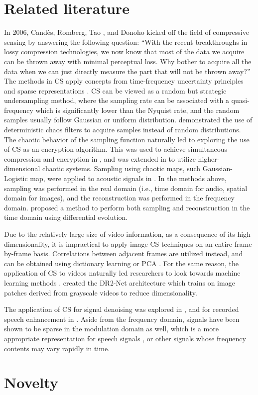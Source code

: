 \section{Related literature}
\label{sec:rrl}
In 2006, Cand\`{e}s, Romberg, Tao \cite{Candes2006}, and Donoho \cite{Donoho2006} kicked off the field of compressive sensing by answering the following question: ``With the recent breakthroughs in lossy compression technologies, we now know that most of the data we acquire can be thrown away with minimal perceptual loss. Why bother to acquire all the data when we can just directly measure the part that will not be thrown away?'' The methods in CS apply concepts from time-frequency uncertainty principles \cite{Donoho2001} and sparse representations \cite{Donoho2003}. CS can be viewed as a random but strategic undersampling method, where the sampling rate can be associated with a quasi-frequency which is significantly lower than the Nyquist rate, and the random samples usually follow Gaussian or uniform distribution. \cite{LinhTrung2008} demonstrated the use of deterministic chaos filters to acquire samples instead of random distributions. The chaotic behavior of the sampling function naturally led to exploring the use of CS as an encryption algorithm. This was used to achieve simultaneous compression and encryption in \cite{Mo2013}, and was extended in \cite{Zhou2016} to utilize higher-dimensional chaotic systems. Sampling using chaotic maps, such Gaussian-Logistic map, were applied to acoustic signals in \cite{Mathew2016}. In the methods above, sampling was performed in the real domain (i.e., time domain for audio, spatial domain for images), and the reconstruction was performed in the frequency domain. \cite{Andras2018} proposed a method to perform both sampling and reconstruction in the time domain using differential evolution.

Due to the relatively large size of video information, as a consequence of its high dimensionality, it is impractical to apply image CS techniques on an entire frame-by-frame basis. Correlations between adjacent frames are utilized instead, and can be obtained using dictionary learning \cite{Liu2013} or PCA \cite{Liu2014}. For the same reason, the application of CS to videos naturally led researchers to look towards machine learning methods \cite{Yao2019}. \cite{Iliadis2018} created the DR2-Net architecture which trains on image patches derived from grayscale videos to reduce dimensionality.

The application of CS for signal denoising was explored in \cite{Dabov2007}, and for recorded speech enhancement in \cite{Low2013}. Aside from the frequency domain, signals have been shown to be sparse in the modulation domain as well, which is a more appropriate representation for speech signals \cite{Low2018}, or other signals whose frequency contents may vary rapidly in time.


\section{Novelty}
\label{sec:novel}
